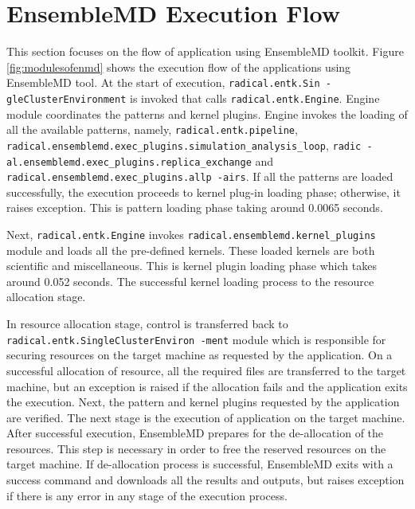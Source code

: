 \documentclass[10pt]{ruthesis}
\begin{document}
\section{EnsembleMD Execution Flow}
This section focuses on the flow of application using EnsembleMD toolkit. Figure \ref{fig:modulesofenmd} shows the execution flow of the applications using EnsembleMD tool. At the start of execution, \texttt{radical.entk.Sin
-gleClusterEnvironment} is invoked that calls \texttt{radical.entk.Engine}. Engine module coordinates the patterns and kernel plugins. Engine invokes the loading of all the available patterns, namely, \texttt{radical.entk.pipeline},  \texttt{radical.ensemblemd.exec\_plugins.simulation\_analysis\_loop},  \texttt{radic
-al.ensemblemd.exec\_plugins.replica\_exchange} and \texttt{radical.ensemblemd.exec\_plugins.allp
-airs}. If all the patterns are loaded successfully, the execution proceeds to kernel plug-in loading phase; otherwise, it raises exception. This is pattern loading phase taking around 0.0065 seconds.

Next, \texttt{radical.entk.Engine} invokes \texttt{radical.ensemblemd.kernel\_plugins} module and loads all the pre-defined kernels. These loaded kernels are both scientific and miscellaneous. This is kernel plugin loading phase which takes around 0.052 seconds. The successful kernel loading process to the resource allocation stage.

In resource allocation stage, control is transferred back to \texttt{radical.entk.SingleClusterEnviron
-ment} module which is responsible for securing resources on the target machine as requested by the application. On a successful allocation of resource, all the required files are transferred to the target machine, but an exception is raised if the allocation fails and the application exits the execution. Next, the pattern and kernel plugins requested by the application are verified. The next stage is the execution of application on the target machine. After successful execution, EnsembleMD prepares for the de-allocation of the resources. This step is necessary in order to free the reserved resources on the target machine. If de-allocation process is successful, EnsembleMD exits with a success command and downloads all the results and outputs, but raises exception if there is any error in any stage of the execution process.
\end{document}

